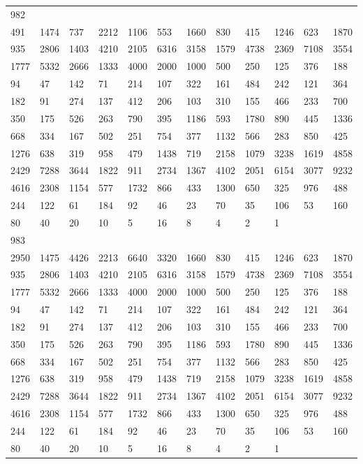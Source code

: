 \begin{longtable}{llllllllllll}
982&&&&&&&&&&&\\
491& 1474& 737& 2212& 1106& 553& 1660& 830& 415& 1246& 623& 1870\\
935& 2806& 1403& 4210& 2105& 6316& 3158& 1579& 4738& 2369& 7108& 3554\\
1777& 5332& 2666& 1333& 4000& 2000& 1000& 500& 250& 125& 376& 188\\
94& 47& 142& 71& 214& 107& 322& 161& 484& 242& 121& 364\\
182& 91& 274& 137& 412& 206& 103& 310& 155& 466& 233& 700\\
350& 175& 526& 263& 790& 395& 1186& 593& 1780& 890& 445& 1336\\
668& 334& 167& 502& 251& 754& 377& 1132& 566& 283& 850& 425\\
1276& 638& 319& 958& 479& 1438& 719& 2158& 1079& 3238& 1619& 4858\\
2429& 7288& 3644& 1822& 911& 2734& 1367& 4102& 2051& 6154& 3077& 9232\\
4616& 2308& 1154& 577& 1732& 866& 433& 1300& 650& 325& 976& 488\\
244& 122& 61& 184& 92& 46& 23& 70& 35& 106& 53& 160\\
80& 40& 20& 10& 5& 16& 8& 4& 2& 1& \\

983&&&&&&&&&&&\\
2950& 1475& 4426& 2213& 6640& 3320& 1660& 830& 415& 1246& 623& 1870\\
935& 2806& 1403& 4210& 2105& 6316& 3158& 1579& 4738& 2369& 7108& 3554\\
1777& 5332& 2666& 1333& 4000& 2000& 1000& 500& 250& 125& 376& 188\\
94& 47& 142& 71& 214& 107& 322& 161& 484& 242& 121& 364\\
182& 91& 274& 137& 412& 206& 103& 310& 155& 466& 233& 700\\
350& 175& 526& 263& 790& 395& 1186& 593& 1780& 890& 445& 1336\\
668& 334& 167& 502& 251& 754& 377& 1132& 566& 283& 850& 425\\
1276& 638& 319& 958& 479& 1438& 719& 2158& 1079& 3238& 1619& 4858\\
2429& 7288& 3644& 1822& 911& 2734& 1367& 4102& 2051& 6154& 3077& 9232\\
4616& 2308& 1154& 577& 1732& 866& 433& 1300& 650& 325& 976& 488\\
244& 122& 61& 184& 92& 46& 23& 70& 35& 106& 53& 160\\
80& 40& 20& 10& 5& 16& 8& 4& 2& 1& \\


\end{longtable}
